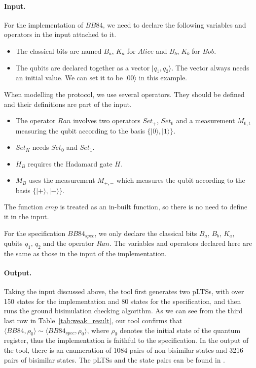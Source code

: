 \documentclass[a4paper,runningheads]{llncs}
\begin{document}
\paragraph{Input.}
For the implementation of $BB84$, we need to declare  the following variables and operators in the input attached to it.
\begin{itemize}
    \item The classical bits are named $B_a$, $K_a$ for $Alice$ and $B_b$, $K_b$ for $Bob$.
    \item The qubits are declared together as a vector $|q_1,q_2\rangle$. The vector always needs an initial value. We can set it to be $|00\rangle$ in this example.
\end{itemize}
When modelling the protocol, we use several operators. They should be defined and their definitions are part of the input. 
\begin{itemize}
    \item The operator $Ran$ involves two operators $Set_{+}$, $Set_{0}$ and a measurement $M_{0,1}$ measuring the qubit according to the basis $\{|0\rangle,|1\rangle\}$. 
    \item $Set_{K}$ needs $Set_{0}$ and $Set_{1}$.
    \item $H_{B}$ requires the Hadamard gate $H$.
    \item $M_{B}$ uses the measurement $M_{+,-}$ which measures the qubit according to the basis $\{|+\rangle,|-\rangle\}$. 
\end{itemize}
The function $cmp$ is treated as an in-built function, so there is no need to define it in the input.

For the specification $BB84_{spec}$, we only declare the classical bits $B_a$, $B_b$, $K_a$, qubits $q_1$, $q_2$ and the operator  $Ran$. The variables and operators declared here are the same as those in the input of the implementation.

\paragraph{Output.}
Taking the input discussed above, the tool first generates two pLTSs, with over 150 states for the implementation and 80 states for the specification, and then runs the ground bisimulation checking algorithm. As we can see from the third last row in Table~\ref{tab:weak_result}, our tool confirms that $\langle BB84, \rho_0\rangle \sim \langle BB84_{spec}, \rho_0\rangle$, where $\rho_0$ denotes the initial state of the quantum register, thus the implementation is faithful to the specification. In the output of the tool, there is an enumeration of 1084 pairs of  non-bisimilar states and 3216 pairs of bisimilar states. The pLTSs and the state pairs can be found in \cite{QBisim}.
\end{document}
